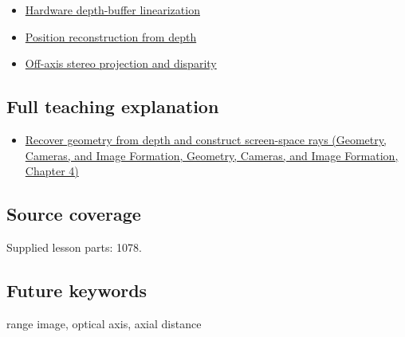 \begin{itemize}
\tightlist
\item
  \hyperref[appendix-1bc40b08db4a]{Hardware depth-buffer linearization}
\item
  \hyperref[appendix-2cbf2968e866]{Position reconstruction from depth}
\item
  \hyperref[appendix-0976e86e5b9f]{Off-axis stereo projection and disparity}
\end{itemize}

\subsection{Full teaching explanation}\label{appendix-cac01ebeeb11-full-teaching-explanation}

\begin{itemize}
\tightlist
\item
  \href{../03-Geometry-Cameras-and-Image-Formation/main.pdf\#nameddest=02-foundations-ii-ch035-recover-geometry-from-depth-and-construct-screen-space-rays}{Recover geometry from depth and construct screen-space rays (Geometry, Cameras, and Image Formation, Geometry, Cameras, and Image Formation, Chapter 4)}
\end{itemize}

\subsection{Source coverage}\label{appendix-cac01ebeeb11-source-coverage}

Supplied lesson parts: 1078.

\subsection{Future keywords}\label{appendix-cac01ebeeb11-future-keywords}

range image, optical axis, axial distance
